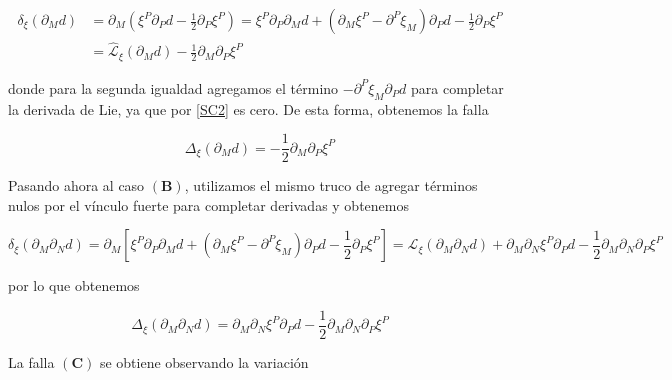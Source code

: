 \documentclass{article}
\numberwithin{equation}{section}
\begin{document}
\begin{equation}\label{key}
\begin{aligned}
\delta_{\xi} \left(\partial_M d \right) &= \partial_M \left( \xi^P \partial_P d - \frac{1}{2}\partial_P\xi^P\right) = \xi^P \partial_P\partial_M d + \left(\partial_M \xi^P - \partial^P \xi_M\right) \partial_P d  - \frac{1}{2}\partial_P\xi^P \\
&=\hat{\mathcal{L}}_{\xi}\left(\partial_M d\right) - \frac{1}{2}\partial_M\partial_P\xi^P
\end{aligned}
\end{equation}

donde para la segunda igualdad agregamos el término $ - \partial^P \xi_M\partial_P d $ para completar la derivada de Lie, ya que por \ref{SC2} es cero. De esta forma, obtenemos la falla

\begin{equation}\label{falla1}
\Delta_{\xi}\left(\partial_M d \right) = - \frac{1}{2}\partial_M\partial_P\xi^P
\end{equation}

Pasando ahora al caso $ (\textbf{B}) $, utilizamos el mismo truco de agregar términos nulos por el vínculo fuerte para completar derivadas y obtenemos

\begin{equation}\label{key}
\delta_{\xi} \left(\partial_M\partial_N d \right) = \partial_M \left[ \xi^P \partial_P\partial_M d + \left(\partial_M \xi^P - \partial^P \xi_M\right) \partial_P d  - \frac{1}{2}\partial_P\xi^P \right]=  \hat{\mathcal{L}}_{\xi}\left(\partial_M \partial_N d\right) + \partial_M \partial_N \xi^P\partial_P d - \frac{1}{2}\partial_M\partial_N\partial_P\xi^P
\end{equation}

por lo que obtenemos

\begin{equation}\label{falla2}
\Delta_{\xi}\left(\partial_M \partial_Nd \right) = \partial_M \partial_N \xi^P\partial_P d - \frac{1}{2}\partial_M\partial_N\partial_P\xi^P
\end{equation}

La falla $ (\textbf{C}) $ se obtiene observando la variación
\end{document}
